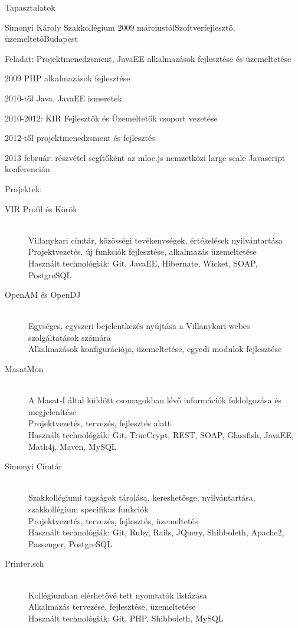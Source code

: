 \documentclass{resume} %
\begin{document}
\begin{rSection}{Tapasztalatok}
\begin{rSubsection}{Simonyi Károly Szakkollégium}
{2009 márciustól}{Szoftverfejlesztő, üzemeltető}{Budapest}
\item Feladat: Projektmenedzsment, JavaEE alkalmazások fejlesztése és üzemeltetése
\item 2009 PHP alkalmazások fejlesztése
\item 2010-től Java, JavaEE ismeretek
\item 2010-2012: KIR Fejlesztők és Üzemeltetők csoport vezetése
\item 2012-től projektmenedzsment és fejlesztés
\item 2013 február: részvétel segítőként az mloc.js nemzetközi large scale Javascript konferencián
\item Projektek:
	\begin{description}
		\item[VIR Profil és Körök] \hfill \\
		Villanykari címtár, közösségi tevékenységek, értékelések nyilvántartása \\
		Projektvezetés, új funkciók fejlesztése, alkalmazás üzemeltetése \\
		Használt technológiák: Git, JavaEE, Hibernate, Wicket, SOAP, PostgreSQL
		\item[OpenAM és OpenDJ] \hfill \\
		Egységes, egyszeri bejelentkezés nyújtása a Villanykari webes szolgáltatások számára \\
		Alkalmazások konfigurációja, üzemeltetése, egyedi modulok fejlesztése
		\item[MasatMon] \hfill \\
		A Masat-I által küldött csomagokban lévő információk feldolgozása és megjelenítése \\
		Projektvezetés, tervezés, fejlesztés alatt \\
		Használt technológiák: Git, TrueCrypt, REST, SOAP, Glassfish, JavaEE, Math4j, Maven, MySQL
		\item[Simonyi Címtár] \hfill \\
		Szakkollégiumi tagságok tárolása, kereshetősge, nyilvántartása, szakkollégium specifikus funkciók \\
		Projektvezetés, tervezés, fejlesztés, üzemeltetés \\
		Használt technológiák: Git, Ruby, Rails, JQuery, Shibboleth, Apache2, Passenger, PostgreSQL
		\item[Printer.sch] \hfill \\
		Kollégiumban elérhetővé tett nyomtatók listázása \\
		Alkalmazás tervezése, fejlesztése, üzemeltetése \\
		Használt technológiák: Git, PHP, Shibboleth, MySQL
	\end{description}
\end{rSubsection}


\end{rSection}
\end{document}
